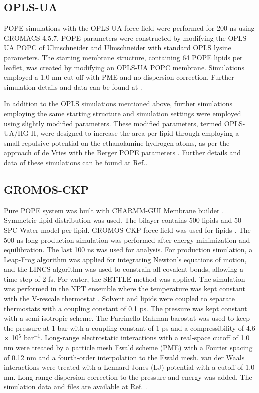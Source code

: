 \documentclass[journal=jpcbfk]{achemso}
\begin{document}
\subsection{OPLS-UA}

 POPE simulations with the OPLS-UA force field were performed for 200 ns using GROMACS 4.5.7. POPE parameters were constructed by modifying the OPLS-UA POPC of Ulmschneider and Ulmschneider \cite{Ulmschneider09} with standard OPLS lysine parameters. The starting membrane structure, containing 64 POPE lipids per leaflet, was created by modifying an OPLS-UA POPC membrane. Simulations employed a 1.0 nm cut-off with PME and no dispersion correction. Further simulation details and data can be found at .

 In addition to the OPLS simulations mentioned above, further simulations employing the same starting structure and simulation settings were employed using slightly modified parameters. These modified parameters, termed OPLS-UA/HG-H, were designed to increase the area per lipid through employing a small repulsive potential on the ethanolamine hydrogen atoms, as per the approach of de Vries with the Berger POPE parameters \cite{devries04}. Further details and data of these simulations can be found at Ref..

\subsection{GROMOS-CKP}

Pure POPE system was built with CHARMM-GUI Membrane builder \cite{lee16}. Symmetric lipid distribution was used. The bilayer contains 500 lipids and 50 SPC Water model per lipid. GROMOS-CKP force field was used for lipids \cite{piggot11}.
The 500-ns-long production simulation was performed after energy minimization and equilibration.
The last 100 ns was used for analysis.
For production simulation, a Leap-Frog algorithm was applied for integrating Newton's equations of motion, and the LINCS algorithm was used to constrain all covalent bonds, allowing a time step of 2 fs. For water, the SETTLE method was applied. The simulation was performed in the NPT ensemble where the temperature was kept constant with the V-rescale thermostat \cite{bussi07}.
Solvent and lipids were coupled to separate thermostats with a coupling constant of 0.1 ps. The pressure was kept constant with a semi-isotropic scheme. The Parrinello-Rahman barostat was used to keep the pressure at 1 bar with a coupling constant of 1 ps and a compressibility of 4.6 $\times$ 10$^5$ bar$^{-1}$. Long-range electrostatic interactions with a real-space cutoff of 1.0 nm were treated by a particle mesh Ewald scheme (PME) with a Fourier spacing of 0.12 nm and a fourth-order interpolation to the Ewald mesh. van der Waals interactions were treated with a Lennard-Jones (LJ) potential with a cutoff of 1.0 nm. Long-range dispersion correction to the pressure and energy was added.
The simulation data and files are available at Ref. .
\end{document}
